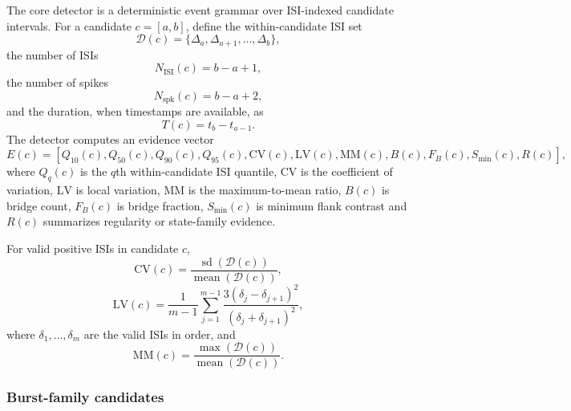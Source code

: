 \documentclass[pdflatex,sn-apa]{sn-jnl}
\newcommand{\isi}{\mathrm{ISI}}
\begin{document}
The core detector is a deterministic event grammar over ISI-indexed candidate intervals. For a candidate $c=[a,b]$, define the within-candidate ISI set
\begin{equation}
    \mathcal{D}(c)=\{\Delta_a,\Delta_{a+1},\ldots,\Delta_b\},
\end{equation}
the number of ISIs
\begin{equation}
    N_{\isi}(c)=b-a+1,
\end{equation}
the number of spikes
\begin{equation}
    N_{\mathrm{spk}}(c)=b-a+2,
\end{equation}
and the duration, when timestamps are available, as
\begin{equation}
    T(c)=t_b-t_{a-1}.
\end{equation}
The detector computes an evidence vector
\begin{equation}
    E(c)=
    \left[
    Q_{10}(c),Q_{50}(c),Q_{90}(c),Q_{95}(c),
    \mathrm{CV}(c),\mathrm{LV}(c),\mathrm{MM}(c),
    B(c),F_B(c),S_{\min}(c),R(c)
    \right],
\end{equation}
where $Q_q(c)$ is the $q$th within-candidate ISI quantile, $\mathrm{CV}$ is the coefficient of variation, $\mathrm{LV}$ is local variation, $\mathrm{MM}$ is the maximum-to-mean ratio, $B(c)$ is bridge count, $F_B(c)$ is bridge fraction, $S_{\min}(c)$ is minimum flank contrast and $R(c)$ summarizes regularity or state-family evidence.

For valid positive ISIs in candidate $c$,
\begin{equation}
    \mathrm{CV}(c)=
    \frac{\operatorname{sd}(\mathcal{D}(c))}
    {\operatorname{mean}(\mathcal{D}(c))},
\end{equation}
\begin{equation}
    \mathrm{LV}(c)=
    \frac{1}{m-1}
    \sum_{j=1}^{m-1}
    \frac{3(\delta_j-\delta_{j+1})^2}
    {(\delta_j+\delta_{j+1})^2},
\end{equation}
where $\delta_1,\ldots,\delta_m$ are the valid ISIs in order, and
\begin{equation}
    \mathrm{MM}(c)=
    \frac{\max(\mathcal{D}(c))}
    {\operatorname{mean}(\mathcal{D}(c))}.
\end{equation}

\subsubsection{Burst-family candidates}
\end{document}
